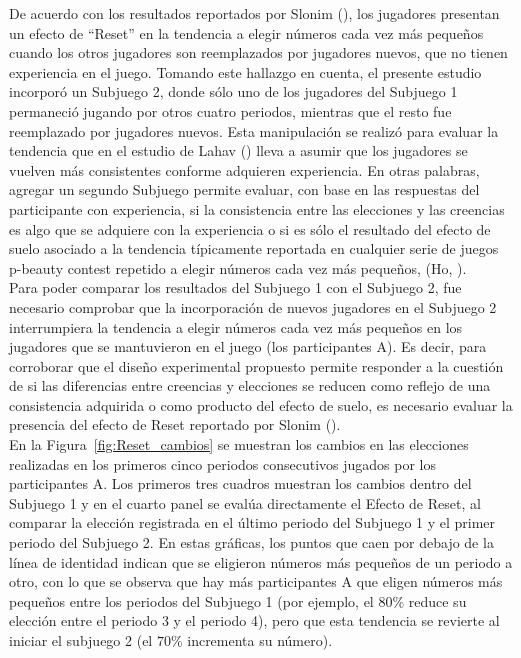 De acuerdo con los resultados reportados por Slonim (\citeyear{Slonim}), los jugadores presentan un efecto de ``Reset'' en la tendencia a elegir números cada vez más pequeños cuando los otros jugadores son reemplazados por jugadores nuevos, que no tienen experiencia en el juego. Tomando este hallazgo en cuenta, el presente estudio incorporó un Subjuego 2, donde sólo uno de los jugadores del Subjuego 1 permaneció jugando por otros cuatro periodos, mientras que el resto fue reemplazado por jugadores nuevos. Esta manipulación se realizó para evaluar la tendencia que en el estudio de Lahav (\citeyear{Lahav}) lleva a asumir que los jugadores se vuelven más consistentes conforme adquieren experiencia. En otras palabras, agregar un segundo Subjuego permite evaluar, con base en las respuestas del participante con experiencia, si la consistencia entre las elecciones y las creencias es algo que se adquiere con la experiencia o si es sólo el resultado del efecto de suelo asociado a la tendencia típicamente reportada en cualquier serie de juegos p-beauty contest repetido a elegir números cada vez más pequeños, (Ho, \citeyear{Teck-Hua}).\\

Para poder comparar los resultados del Subjuego 1 con el Subjuego 2, fue necesario comprobar que la incorporación de nuevos jugadores en el Subjuego 2 interrumpiera la tendencia a elegir números cada vez más pequeños en los jugadores que se mantuvieron en el juego (los participantes A). Es decir, para corroborar que el diseño experimental propuesto permite responder a la cuestión de si las diferencias entre creencias y elecciones se reducen como reflejo de una consistencia adquirida o como producto del efecto de suelo, es necesario evaluar la presencia del efecto de Reset reportado por Slonim (\citeyear{Slonim}).\\

En la Figura~\ref{fig:Reset_cambios} se muestran los cambios en las elecciones realizadas en los primeros cinco periodos consecutivos jugados por los participantes A. Los primeros tres cuadros muestran los cambios dentro del Subjuego 1 y en el cuarto panel se evalúa directamente el Efecto de Reset, al comparar la elección registrada en el último periodo del Subjuego 1 y el primer periodo del Subjuego 2. En estas gráficas, los puntos que caen por debajo de la línea de identidad indican que se eligieron números más pequeños de un periodo a otro, con lo que se observa que hay más participantes A que eligen números más pequeños entre los periodos del Subjuego 1 (por ejemplo, el $80\%$ reduce su elección entre el periodo 3 y el periodo 4), pero que esta tendencia se revierte al iniciar el subjuego 2 (el $70\%$ incrementa su número).\\

